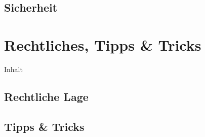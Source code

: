 \documentclass{beamer}
\begin{document}
			\begin{frame}{}
			\end{frame}
			
		\subsection{Sicherheit}
			
			\begin{frame}{}
			\end{frame}
	
	\section{Rechtliches, Tipps \& Tricks}
		
		\begin{frame}[t]{Inhalt}
		\end{frame}
	
		\subsection{Rechtliche Lage}
			
			\begin{frame}{}
			\end{frame}
		
		\subsection{Tipps \& Tricks}
\end{document}
